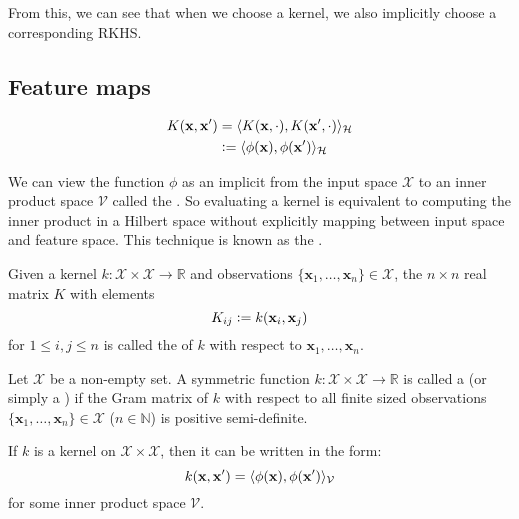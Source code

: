 From this, we can see that when we choose a kernel, we also implicitly choose a corresponding RKHS.

\subsection{Feature maps}

\begin{align}
  K(\mathbf{x}, \mathbf{x}^\prime) &= \langle K(\mathbf{x}, \cdot), K(\mathbf{x}^\prime, \cdot)\rangle_\mathcal{H} \\
                                   &\vcentcolon= \langle\phi(\mathbf{x}), \phi(\mathbf{x}^\prime)\rangle_\mathcal{H}
\end{align}

We can view the function $\phi$ as an implicit  from the input space $\mathcal{X}$ to an inner product space $\mathcal{V}$ called the . So evaluating a kernel is equivalent to computing the inner product in a Hilbert space without explicitly mapping between input space and feature space. This technique is known as the .

\begin{definition}
Given a kernel $k : \mathcal{X} \times \mathcal{X} \to \mathbb{R}$ and observations $\{ \mathbf{x}_1, \dotsc, \mathbf{x}_n \} \in \mathcal{X}$, the $n \times n$ real matrix $K$ with elements
\begin{equation}
  K_{ij} \vcentcolon= k(\mathbf{x}_i, \mathbf{x}_j)
\end{equation}
for $1 \leq i, j \leq n$ is called the  of $k$ with respect to $\mathbf{x}_1, \dotsc, \mathbf{x}_n$.
\end{definition}


\begin{definition}
Let $\mathcal{X}$ be a non-empty set. A symmetric function $k : \mathcal{X} \times \mathcal{X} \to \mathbb{R}$ is called a  (or simply a ) if the Gram matrix of $k$ with respect to all finite sized observations $\{ \mathbf{x}_1, \dotsc, \mathbf{x}_n \} \in \mathcal{X}$ ($n \in \mathbb{N}$) is positive semi-definite.
\end{definition}

\begin{theorem}
If $k$ is a kernel on $\mathcal{X} \times \mathcal{X}$, then it can be written in the form:
\begin{equation}
  k(\mathbf{x}, \mathbf{x}^\prime) = \langle\phi(\mathbf{x}), \phi(\mathbf{x}^\prime)\rangle_\mathcal{V}
\end{equation}
for some inner product space $\mathcal{V}$.
\end{theorem}


